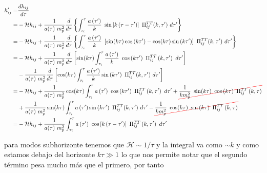 \begin{equation*}
    \begin{split}
        h^\prime_{ij} =& \frac{dh_{ij}}{d\tau}\\
        =& -\mathcal{H} h_{ij} + \frac{1}{a(\tau) ~ m_p^2} \frac{d}{d\tau} \left\{ \int_{\tau_i}^{\tau} \frac{a \left( \tau^\prime \right)}{k} ~ \sin \left[ k \left( \tau - \tau^\prime \right) \right] ~ \Pi_{ij}^{TT} (k, \tau^\prime) ~ d\tau^\prime \right\}\\
        =& -\mathcal{H} h_{ij} + \frac{1}{a(\tau) ~ m_p^2} \frac{d}{d\tau} \left\{ \int_{\tau_i}^{\tau} \frac{a \left( \tau^\prime \right)}{k} ~ \left[ \sin (k \tau) \cos \left( k \tau^\prime \right) - \cos (k \tau) \sin \left( k \tau^\prime \right) \right] ~ \Pi_{ij}^{TT} (k, \tau^\prime) ~ d\tau^\prime \right\}\\
        =& -\mathcal{H} h_{ij} + \frac{1}{a(\tau) ~ m_p^2} \frac{d}{d\tau} \left[ \sin (k \tau) \int_{\tau_i}^{\tau} \frac{a \left( \tau^\prime \right)}{k} ~ \cos \left( k \tau^\prime \right) ~ \Pi^{TT}_{ij} \left( k, \tau^\prime \right) ~ d\tau^\prime \right]\\
        &- \frac{1}{a(\tau) ~ m_p^2} \frac{d}{d\tau} \left[ \cos (k \tau) \int_{\tau_i}^\tau \frac{a \left( \tau^\prime \right)}{k} \sin \left( k \tau^\prime \right) ~ \Pi_{ij}^{TT} (k, \tau^\prime) ~ d\tau^\prime \right]\\
        =& -\mathcal{H} h_{ij} + \frac{1}{a(\tau) ~ m_p^2} \cos (k \tau) \int_{\tau_i}^{\tau} a \left( \tau^\prime \right) ~ \cos \left( k \tau^\prime \right) ~ \Pi^{TT}_{ij} \left( k, \tau^\prime \right) ~ d\tau^\prime + \colorcancel{red}{\frac{1}{k m_p^2} ~ \sin (k \tau) ~ \cos \left( k \tau \right) ~ \Pi^{TT}_{ij} \left( k, \tau \right)}\\
        &+ \frac{1}{a(\tau) ~ m_p^2} \sin (k \tau) \int_{\tau_i}^\tau a \left( \tau^\prime \right) \sin \left( k \tau^\prime \right) ~ \Pi_{ij}^{TT} (k, \tau^\prime) ~ d\tau^\prime - \colorcancel{red}{\frac{1}{k m_p^2} ~ \cos (k \tau) ~ \sin \left( k \tau \right) ~ \Pi^{TT}_{ij} \left( k, \tau \right)}\\
        =& -\mathcal{H} h_{ij} + \frac{1}{a(\tau) ~ m_p^2} \int_{\tau_i}^{\tau} a \left( \tau^\prime \right) ~ \cos \left[ k \left( \tau - \tau^\prime \right) \right] ~ \Pi^{TT}_{ij} \left( k, \tau^\prime \right) ~ d\tau^\prime
    \end{split}
\end{equation*}

\noindent
para modos subhorizonte tenemos que $\mathcal{H} \sim 1/\tau$ y la integral va como $\sim k$ y como estamos debajo del horizonte $k\tau \gg 1$ lo que nos permite notar que el segundo término pesa mucho más que el primero, por tanto

